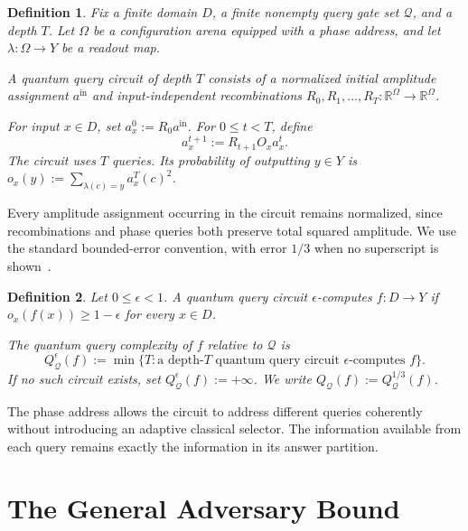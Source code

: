 \documentclass[11pt]{article}
\numberwithin{equation}{section}
\newtheorem{definition}{Definition}[section]
\theoremstyle{remark}
\begin{document}
\begin{definition}
\label{def:quantum-query-circuit}
Fix a finite domain $D$, a finite nonempty query gate set $\mathcal Q$, and a
depth $T$. Let $\Omega$ be a configuration arena equipped with a phase
address, and let $\lambda:\Omega\to Y$ be a readout map.

A \emph{quantum query circuit of depth $T$} consists of a normalized initial
amplitude assignment $a^{\mathrm{in}}$ and input-independent recombinations
$R_0,R_1,\ldots,R_T:\mathbb R^\Omega\to\mathbb R^\Omega$.

For input $x\in D$, set $a_x^0:=R_0a^{\mathrm{in}}$. For
$0\leq t<T$, define
\begin{equation}
    a_x^{t+1}:=R_{t+1}O_xa_x^t.
\end{equation}
The circuit uses $T$ queries. Its probability of outputting $y\in Y$ is
$o_x(y):=\sum_{\lambda(c)=y}a_x^T(c)^2$.
\end{definition}

Every amplitude assignment occurring in the circuit remains normalized,
since recombinations and phase queries both preserve total squared amplitude.
We use the standard bounded-error convention, with error $1/3$ when no
superscript is shown~\cite{BealsBuhrmanCleveMoscaDeWolf2001}.

\begin{definition}
\label{def:quantum-query-complexity}
Let $0\leq\epsilon<1$. A quantum query circuit
$\epsilon$-\emph{computes} $f:D\to Y$ if
$o_x(f(x))\geq1-\epsilon$ for every $x\in D$.

The \emph{quantum query complexity} of $f$ relative to $\mathcal Q$ is
\begin{equation}
    Q_{\mathcal Q}^{\epsilon}(f)
    :=
    \min\{
        T:
        \text{a depth-$T$ quantum query circuit $\epsilon$-computes $f$}
    \}.
\end{equation}
If no such circuit exists, set $Q_{\mathcal Q}^{\epsilon}(f):=+\infty$.
We write $Q_{\mathcal Q}(f):=Q_{\mathcal Q}^{1/3}(f)$.
\end{definition}

The phase address allows the circuit to address different queries coherently
without introducing an adaptive classical selector. The information available
from each query remains exactly the information in its answer partition.


\section{The General Adversary Bound}
\label{sec:general-adversary-bound}
\end{document}
